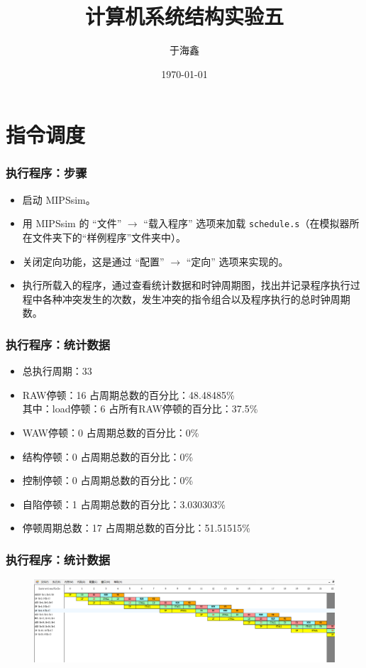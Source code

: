 \documentclass[UTF8]{ctexbeamer}
\newcommand{\code}[1]{\colorbox{light-gray}{\texttt{#1}}}
\begin{document}
\title{计算机系统结构实验五}
\author{\songti 于海鑫}

\date{\today}

\frame{\titlepage}

\section{指令调度}
\begin{frame}
\frametitle{执行程序：步骤}
\begin{itemize}
    \item 启动 MIPSsim。
    \item 用 MIPSsim 的 ``文件'' $\rightarrow$ ``载入程序'' 选项来加载 \code{schedule.s}（在模拟器所在文件夹下的“样例程序”文件夹中）。
    \item 关闭定向功能，这是通过 ``配置'' $\rightarrow$ ``定向'' 选项来实现的。
    \item  执行所载入的程序，通过查看统计数据和时钟周期图，找出并记录程序执行过程中各种冲突发生的次数，发生冲突的指令组合以及程序执行的总时钟周期数。
\end{itemize}
\end{frame}

\begin{frame}
    \frametitle{执行程序：统计数据}
    \begin{itemize}
        \item 总执行周期：33
        \item RAW停顿：16		占周期总数的百分比：48.48485\%
        \\ 其中：load停顿：6		占所有RAW停顿的百分比：37.5\%
        \item WAW停顿：0		占周期总数的百分比：0\%
        \item 结构停顿：0		占周期总数的百分比：0\%
        \item 控制停顿：0		占周期总数的百分比：0\%
        \item 自陷停顿：1		占周期总数的百分比：3.030303\%
        \item 停顿周期总数：17	占周期总数的百分比：51.51515\%
    \end{itemize}
\end{frame}

\begin{frame}
    \frametitle{执行程序：统计数据}
    \begin{figure}[H]
        \centering
        \includegraphics[width=\textwidth]{fig/schedule.png}
      \end{figure}
\end{frame}
\end{document}
